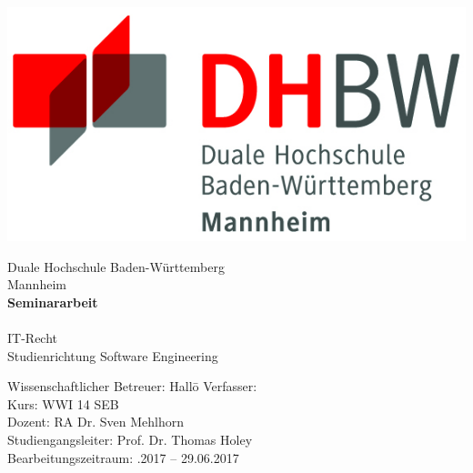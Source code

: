 \begin{titlepage}
\begin{minipage}{\textwidth}
		\noindent  \hfill   \includegraphics{img/logo.jpg}
\end{minipage}
\vspace{1em}
\sffamily
\begin{center}
	\textsf{\large{}Duale Hochschule Baden-W\"urttemberg\\[1.5mm] Mannheim}\\[2em]
	\textsf{\textbf{\Large{}Seminararbeit}}\\[3mm]
	\textsf{\textbf{\DerTitelDerArbeit}} \\[1.5cm]
	\textsf{\Large{IT-Recht}\\[3mm]
	\textsf{\small{}Studienrichtung Software Engineering}}
	
\vspace{12em}

\begin{minipage}{\textwidth}

\begin{tabbing}
	Wissenschaftlicher Betreuer: Hallo\hspace{0.85cm}\=\kill
	Verfasser: \> \DerAutorDerArbeit \\[1.5mm]
	Kurs: \> WWI 14 SEB \\[1.5mm]
	Dozent: \> RA Dr. Sven Mehlhorn \\[1.5mm]
	Studiengangsleiter: \> Prof. Dr. Thomas Holey  \\[1.5mm]
	Bearbeitungszeitraum: .2017 -- 29.06.2017
\end{tabbing}
\end{minipage}

\end{center}

\end{titlepage}